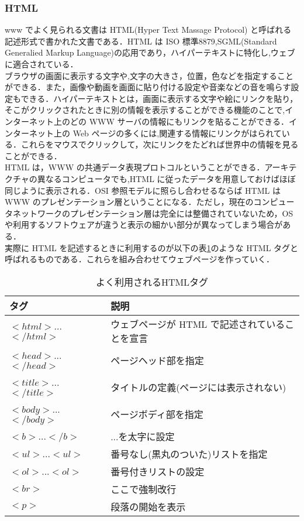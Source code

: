 \documentclass[a4j,titlepage]{jarticle}
\begin{document}
\subsubsection{HTML}
www でよく見られる文書は HTML(Hyper Text Massage Protocol) と呼ばれる記述形式で書かれた文書である．HTML は ISO 標準8879,SGML(Standard Generalied Markup Language)の応用であり，ハイパーテキストに特化し,ウェブに適合されている\cite{htmltext}．\\
ブラウザの画面に表示する文字や,文字の大きさ，位置，色などを指定することができる．また，画像や動画を画面に貼り付ける設定や音楽などの音を鳴らす設定もできる．ハイパーテキストとは，画面に表示する文字や絵にリンクを貼り，そこがクリックされたときに別の情報を表示することができる機能のことで,インターネット上のどの WWW サーバの情報にもリンクを貼ることができる．インターネット上の Web ページの多くには,関連する情報にリンクがはられている．これらをマウスでクリックして，次にリンクをたどれば世界中の情報を見ることができる．\\
HTML は，WWW の共通データ表現プロトコルということができる．アーキテクチャの異なるコンピュータでも,HTML に従ったデータを用意しておけばほぼ同じように表示される．OSI 参照モデルに照らし合わせるならば HTML は WWW のプレゼンテーション層ということになる．ただし，現在のコンピュータネットワークのプレゼンテーション層は完全には整備されていないため，OS や利用するソフトウェアが違うと表示の細かい部分が異なってしまう場合がある\cite{bib:iptext}．\\
実際に HTML を記述するときに利用するのが以下の表\ref{tab:html}のような HTML タグと呼ばれるものである．これらを組み合わせてウェブページを作っていく．


\begin{table}[htbp]
\caption{よく利用されるHTMLタグ}
\label{tab:html}
\begin{center}
\begin{tabular}{|l|l|}
  \hline
  タグ & 説明 \\ \hline \hline
  $<html>$...$</html>$ & ウェブページが HTML で記述されていることを宣言 \\ \hline
  $<head>$...$</head>$ & ページヘッド部を指定 \\ \hline
  $<title>$...$</title>$ & タイトルの定義(ページには表示されない) \\ \hline
  $<body>$...$</body>$ & ページボディ部を指定 \\ \hline
  $<b>$...$</b>$ & ...を太字に設定 \\ \hline
  $<ul>$...$<ul>$ & 番号なし(黒丸のついた)リストを指定 \\ \hline
  $<ol>$...$<ol>$ & 番号付きリストの設定 \\ \hline
  $<br>$ & ここで強制改行 \\ \hline
  $<p>$ & 段落の開始を表示 \\
  \hline
\end{tabular}
\end{center}
\end{table}
\end{document}
